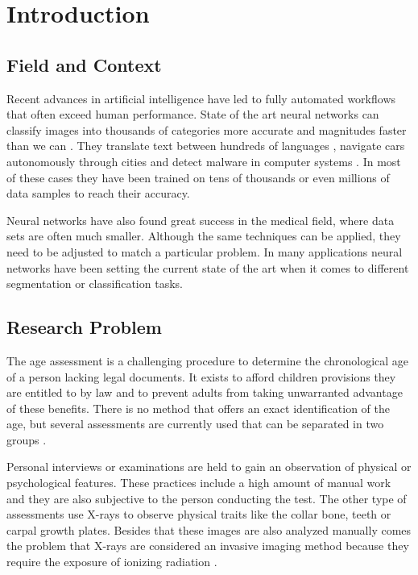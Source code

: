 \section{Introduction}

\subsection{Field and Context}

Recent advances in artificial intelligence have led to fully automated workflows that often exceed human performance. State of the art neural networks can classify images into thousands of categories more accurate and magnitudes faster than we can \cite{He2015a}. They translate text between hundreds of languages \cite{Wu2016}, navigate cars autonomously through cities \cite{Bojarski2017} and detect malware in computer systems \cite{Saxe2015}. In most of these cases they have been trained on tens of thousands or even millions of data samples to reach their accuracy. 

Neural networks have also found great success in the medical field, where data sets are often much smaller. Although the same techniques can be applied, they need to be adjusted to match a particular problem. In many applications neural networks have been setting the current state of the art when it comes to different segmentation or classification tasks.

\subsection{Research Problem}

The age assessment is a challenging procedure to determine the chronological age of a person lacking legal documents. It exists to afford children provisions they are entitled to by law and to prevent adults from taking unwarranted advantage of these benefits. There is no method that offers an exact identification of the age, but several assessments are currently used that can be separated in two groups \cite{EuropeanAsylumSupportOffice2013}.

Personal interviews or examinations are held to gain an observation of physical or psychological features. These practices include a high amount of manual work and they are also subjective to the person conducting the test. The other type of assessments use X-rays to observe physical traits like the collar bone, teeth or carpal growth plates. Besides that these images are also analyzed manually comes the problem that X-rays are considered an invasive imaging method because they require the exposure of ionizing radiation \cite{EuropeanAsylumSupportOffice2013}.


